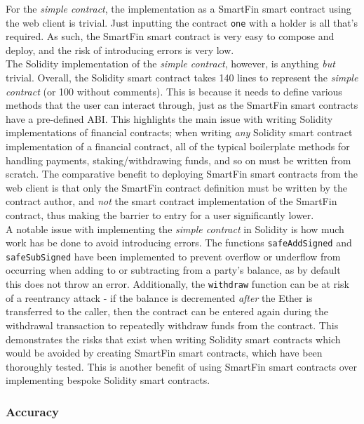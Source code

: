 For the \textit{simple contract}, the implementation as a SmartFin smart contract using the web client is trivial. Just inputting the contract \texttt{one} with a holder is all that's required. As such, the SmartFin smart contract is very easy to compose and deploy, and the risk of introducing errors is very low. \\

The Solidity implementation of the \textit{simple contract}, however, is anything \textit{but} trivial. Overall, the Solidity smart contract takes 140 lines to represent the \textit{simple contract} (or 100 without comments). This is because it needs to define various methods that the user can interact through, just as the SmartFin smart contracts have a pre-defined ABI. This highlights the main issue with writing Solidity implementations of financial contracts; when writing \textit{any} Solidity smart contract implementation of a financial contract, all of the typical boilerplate methods for handling payments, staking/withdrawing funds, and so on must be written from scratch. The comparative benefit to deploying SmartFin smart contracts from the web client is that only the SmartFin contract definition must be written by the contract author, and \textit{not} the smart contract implementation of the SmartFin contract, thus making the barrier to entry for a user significantly lower. \\

A notable issue with implementing the \textit{simple contract} in Solidity is how much work has be done to avoid introducing errors. The functions \texttt{safeAddSigned} and \texttt{safeSubSigned} have been implemented to prevent overflow or underflow from occurring when adding to or subtracting from a party's balance, as by default this does not throw an error. Additionally, the \texttt{withdraw} function can be at risk of a reentrancy attack - if the balance is decremented \textit{after} the Ether is transferred to the caller, then the contract can be entered again during the withdrawal transaction to repeatedly withdraw funds from the contract. This demonstrates the risks that exist when writing Solidity smart contracts which would be avoided by creating SmartFin smart contracts, which have been thoroughly tested. This is another benefit of using SmartFin smart contracts over implementing bespoke Solidity smart contracts.


\subsubsection{Accuracy}

